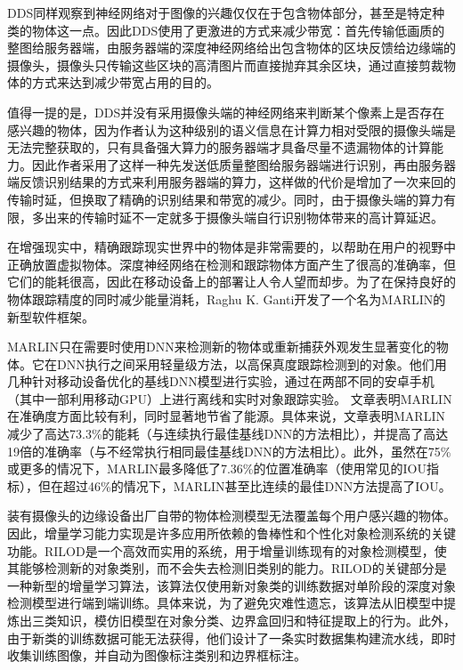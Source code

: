 DDS\cite{liu2019edge}同样观察到神经网络对于图像的兴趣仅仅在于包含物体部分，甚至是特定种类的物体这一点。因此DDS使用了更激进的方式来减少带宽：首先传输低画质的整图给服务器端，由服务器端的深度神经网络给出包含物体的区块反馈给边缘端的摄像头，摄像头只传输这些区块的高清图片而直接抛弃其余区块，通过直接剪裁物体的方式来达到减少带宽占用的目的。

值得一提的是，DDS并没有采用摄像头端的神经网络来判断某个像素上是否存在感兴趣的物体，因为作者认为这种级别的语义信息在计算力相对受限的摄像头端是无法完整获取的，只有具备强大算力的服务器端才具备尽量不遗漏物体的计算能力。因此作者采用了这样一种先发送低质量整图给服务器端进行识别，再由服务器端反馈识别结果的方式来利用服务器端的算力，这样做的代价是增加了一次来回的传输时延，但换取了精确的识别结果和带宽的减少。同时，由于摄像头端的算力有限，多出来的传输时延不一定就多于摄像头端自行识别物体带来的高计算延迟。

在增强现实中，精确跟踪现实世界中的物体是非常需要的，以帮助在用户的视野中正确放置虚拟物体。深度神经网络在检测和跟踪物体方面产生了很高的准确率，但它们的能耗很高，因此在移动设备上的部署让人令人望而却步。为了在保持良好的物体跟踪精度的同时减少能量消耗，Raghu K. Ganti开发了一个名为MARLIN\cite{ApiRanChe19}的新型软件框架。

MARLIN只在需要时使用DNN来检测新的物体或重新捕获外观发生显著变化的物体。它在DNN执行之间采用轻量级方法，以高保真度跟踪检测到的对象。他们用几种针对移动设备优化的基线DNN模型进行实验，通过在两部不同的安卓手机（其中一部利用移动GPU）上进行离线和实时对象跟踪实验。
文章表明MARLIN在准确度方面比较有利，同时显著地节省了能源。具体来说，文章表明MARLIN减少了高达73.3\%的能耗（与连续执行最佳基线DNN的方法相比），并提高了高达19倍的准确率（与不经常执行相同最佳基线DNN的方法相比）。此外，虽然在75\%或更多的情况下，MARLIN最多降低了7.36\%的位置准确率（使用常见的IOU指标），但在超过46\%的情况下，MARLIN甚至比连续的最佳DNN方法提高了IOU。

装有摄像头的边缘设备出厂自带的物体检测模型无法覆盖每个用户感兴趣的物体。因此，增量学习能力实现是许多应用所依赖的鲁棒性和个性化对象检测系统的关键功能。RILOD\cite{LiTasGho19}是一个高效而实用的系统，用于增量训练现有的对象检测模型，使其能够检测新的对象类别，而不会失去检测旧类别的能力。RILOD的关键部分是一种新型的增量学习算法，该算法仅使用新对象类的训练数据对单阶段的深度对象检测模型进行端到端训练。具体来说，为了避免灾难性遗忘，该算法从旧模型中提炼出三类知识，模仿旧模型在对象分类、边界盒回归和特征提取上的行为。此外，由于新类的训练数据可能无法获得，他们设计了一条实时数据集构建流水线，即时收集训练图像，并自动为图像标注类别和边界框标注。

